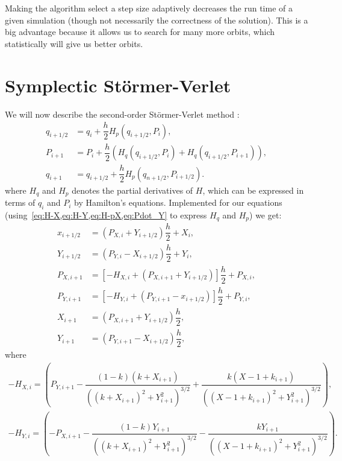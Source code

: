 Making the algorithm select a step size adaptively decreases the run time of a given simulation (though not necessarily the correctness of the solution). This is a big advantage because it allows us to search for many more orbits, which statistically will give us better orbits.

\section{Symplectic Störmer-Verlet}
We will now describe the second-order Störmer-Verlet method \cite{Hochbruck2008}:
\begin{align}
q_{i+1/2} &= q_i + \dfrac{h}{2}H_p(q_{i+1/2}, P_i), \\
P_{i+1} &= P_i + \dfrac{h}{2}(H_q(q_{i+1/2}, P_i) + H_q(q_{i+1/2}, P_{i+1})), \\
q_{i+1} &= q_{i+1/2} + \dfrac{h}{2}H_p(q_{n+1/2}, P_{i+1/2}).
\end{align}
where $H_q$ and $H_p$ denotes the partial derivatives of $H$, which can be expressed in terms of $q_i$ and $P_i$ by Hamilton's equations. Implemented for our equations (using~\cref{eq:H-X,eq:H-Y,eq:H-pX,eq:Pdot_Y} to express $H_q$ and $H_p$) we get:
\begin{align}
x_{i+1/2} &= (P_{X,i} + Y_{i+1/2})\dfrac{h}{2} + X_i, \\[0.3cm]
Y_{i+1/2} &= (P_{Y,i} - X_{i+1/2})\dfrac{h}{2} + Y_i, \\[0.8cm]
%
%
P_{X,i+1} &= \left[-H_{X,i} + (P_{X,i+1} + Y_{i+1/2}) \right]\dfrac{h}{2} + P_{X,i}, \\[0.3cm]
%
P_{Y,i+1} &= \left[-H_{Y,i} + (P_{Y,i+1} -x_{i+1/2}) \right]\dfrac{h}{2} + P_{Y,i},\\[0.8cm]
%
%
X_{i+1} &= (P_{X,i+1} + Y_{i+1/2})\dfrac{h}{2}, \\[0.3cm]
Y_{i+1} &= (P_{Y,i+1} - X_{i+1/2})\dfrac{h}{2},
\end{align}
where
\begin{align}
-H_{X,i} = \left(P_{Y,i+1} - \dfrac{(1-k)(k+X_{i+1})}{((k+X_{i+1})^2+Y_{i+1}^2)^{3/2}} + \dfrac{k(X-1+k_{i+1})}{((X-1+k_{i+1})^2+Y_{i+1}^2)^{3/2}}\right), \\[0.5cm]
-H_{Y,i} = \left(-P_{X,i+1} - \dfrac{(1-k)Y_{i+1}}{((k+X_{i+1})^2+Y_{i+1}^2)^{3/2}} - \dfrac{k Y_{i+1}}{((X-1+k_{i+1})^2+Y_{i+1}^2)^{3/2}}\right).
\end{align}


